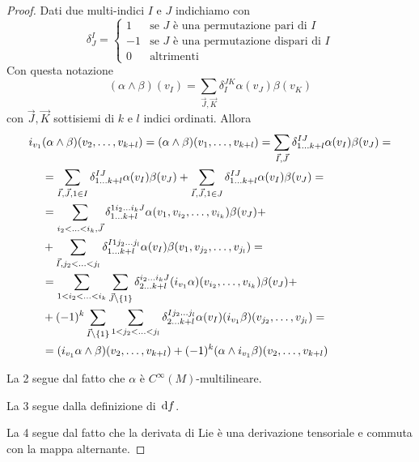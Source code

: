 \begin{proof}
	Dati due multi-indici $I$ e $J$ indichiamo con
	\begin{equation*}
		\delta_J^I = \begin{cases}
		             	1 & \text{se } J \text{ è una permutazione pari di }I\\
		             	-1 & \text{se } J \text{ è una permutazione dispari di }I\\
		             	0 & \text{altrimenti}
		             \end{cases}
	\end{equation*}
	Con questa notazione
	\begin{equation*}
		(\alpha\wedge\beta)(v_I) = \sum_{\vec J, \vec K} \delta_I^{JK} \alpha(v_J)\beta(v_K)
	\end{equation*}
	con $\vec J,\vec K$ sottisiemi di $k$ e $l$ indici ordinati. Allora
 	\begin{align*}
 		i_{v_1}&(\alpha\wedge\beta)(v_2,\ldots, v_{k+l}) = (\alpha\wedge\beta) (\seqb v{k+l},) =
 		\sum_{\vec I,\vec J} \delta_{1\ldots k+l}^{IJ} \alpha(v_I)\beta(v_J) =\\
 		&= \sum_{\vec I,\vec J,1\in I} \delta_{1 \ldots k+l}^{IJ} \alpha(v_I)\beta(v_J) + \sum_{\vec I,\vec J,1\in J} \delta_{1\ldots k+l}^{IJ} \alpha(v_I)\beta(v_J) =\\
 		&= \sum_{i_2<\ldots < i_k,\vec J} \delta_{1 \ldots k+l}^{1i_2 \ldots i_kJ}\alpha(v_1,v_{i_2},\ldots,v_{i_k}) \beta(v_J) +\\
 		& +\sum_{\vec I, j_2<\ldots < j_l} \delta_{1 \ldots k+l}^{I1j_2 \ldots j_l}\alpha(v_I) \beta(v_1,v_{j_2},\ldots,v_{j_l}) =\\
 		& = \sum_{1<i_2<\ldots<i_k} \sum_{\vec J\setminus \{1\}} \delta_{2\ldots k+l}^{i_2\ldots i_kJ} (i_{v_1}\alpha)(v_{i_2},\ldots,v_{i_k}) \beta (v_J) +\\
 		& +(-1)^k \sum_{\vec I\setminus \{1\}} \sum_{1<j_2<\ldots<j_l} \delta_{2\ldots k+l}^{Ij_2\ldots j_l} \alpha(v_I) (i_{v_1}\beta)(v_{j_2}, \ldots, v_{j_l}) =\\
 		& = (i_{v_1}\alpha \wedge \beta)(v_2, \ldots, v_{k+l}) + (-1)^k (\alpha \wedge i_{v_1}\beta)(v_2, \ldots, v_{k+l})
 	\end{align*}
 	
 	La 2 segue dal fatto che $\alpha$ è $C^\infty(M)$-multilineare.
	
	La 3 segue dalla definizione di $\de f$.
	
	La 4 segue dal fatto che la derivata di Lie è una derivazione tensoriale e commuta con la mappa alternante.
	

\end{proof}
